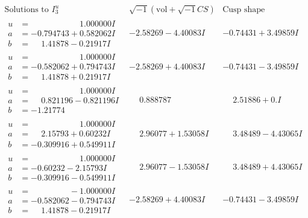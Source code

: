 \documentclass[1p]{elsarticle_modified}
\theoremstyle{definition}
\newcommand{\I}{\sqrt{-1}}
\begin{document}
$$\begin{array}{c|c|c}  
\text{Solutions to }I^u_{3}& \I (\text{vol} + \sqrt{-1}CS) & \text{Cusp shape}\\
 \hline 
\begin{aligned}
u &= \phantom{-0.000000 -}1.000000 I \\
a &= -0.794743 + 0.582062 I \\
b &= \phantom{-}1.41878 - 0.21917 I\end{aligned}
 & -2.58269 - 4.40083 I & -0.74431 + 3.49859 I \\ \hline\begin{aligned}
u &= \phantom{-0.000000 -}1.000000 I \\
a &= -0.582062 + 0.794743 I \\
b &= \phantom{-}1.41878 + 0.21917 I\end{aligned}
 & -2.58269 + 4.40083 I & -0.74431 - 3.49859 I \\ \hline\begin{aligned}
u &= \phantom{-0.000000 -}1.000000 I \\
a &= \phantom{-}0.821196 - 0.821196 I \\
b &= -1.21774\phantom{ +0.000000I}\end{aligned}
 & \phantom{-}0.888787\phantom{ +0.000000I} & \phantom{-}2.51886 + 0. I\phantom{ +0.000000I} \\ \hline\begin{aligned}
u &= \phantom{-0.000000 -}1.000000 I \\
a &= \phantom{-}2.15793 + 0.60232 I \\
b &= -0.309916 + 0.549911 I\end{aligned}
 & \phantom{-}2.96077 + 1.53058 I & \phantom{-}3.48489 - 4.43065 I \\ \hline\begin{aligned}
u &= \phantom{-0.000000 -}1.000000 I \\
a &= -0.60232 - 2.15793 I \\
b &= -0.309916 - 0.549911 I\end{aligned}
 & \phantom{-}2.96077 - 1.53058 I & \phantom{-}3.48489 + 4.43065 I \\ \hline\begin{aligned}
u &= \phantom{-0.000000 } -1.000000 I \\
a &= -0.582062 - 0.794743 I \\
b &= \phantom{-}1.41878 - 0.21917 I\end{aligned}
 & -2.58269 + 4.40083 I & -0.74431 - 3.49859 I \\ \hline\begin{aligned}

\end{aligned}
\end{array}$$
\end{document}

